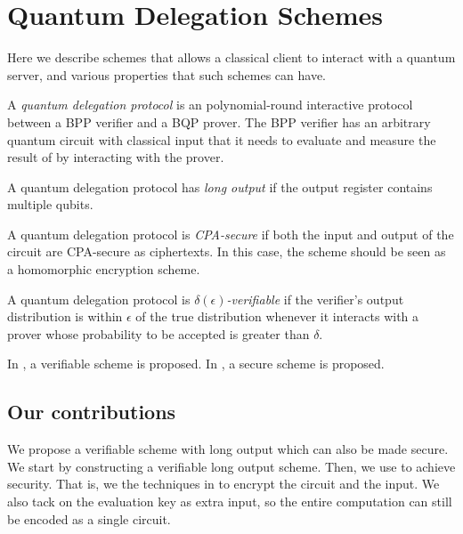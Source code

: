 \section{Quantum Delegation Schemes}

Here we describe schemes that allows a classical client to interact with a quantum server, and various properties that such schemes can have.

\begin{definition}
	A \emph{quantum delegation protocol} is an polynomial-round interactive protocol between a BPP verifier and a BQP prover. The BPP verifier has an arbitrary quantum circuit with classical input that it needs to evaluate and measure the result of by interacting with the prover.
\end{definition}

\begin{definition}
	A quantum delegation protocol has \emph{long output} if the output register contains multiple qubits.
\end{definition}

\begin{definition}
	A quantum delegation protocol is \emph{CPA-secure} if both the input and output of the circuit are CPA-secure as ciphertexts. In this case, the scheme should be seen as a homomorphic encryption scheme.
\end{definition}

\begin{definition}
	A quantum delegation protocol is \emph{$\delta(\epsilon)$-verifiable} if the verifier's output distribution is within $\epsilon$ of the true distribution whenever it interacts with a prover whose probability to be accepted is greater than $\delta$.
\end{definition}

In \cite{mahadev_delegation}, a verifiable scheme is proposed. In \cite{mahadev_qfhe}, a secure scheme is proposed. 


\subsection{Our contributions}

We propose a verifiable scheme with long output which can also be made secure. We start by constructing a verifiable long output scheme. Then, we use \cite{mahadev_delegation} to achieve security. That is, we the techniques in \cite{mahadev_delegation} to encrypt the circuit and the input. We also tack on the evaluation key as extra input, so the entire computation can still be encoded as a single circuit.
